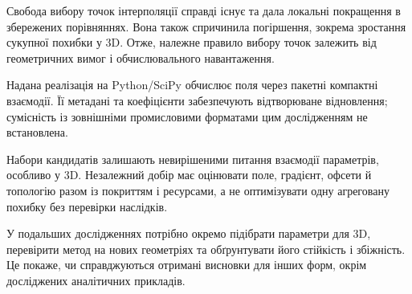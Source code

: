 \documentclass[12pt]{article}
\begin{document}
Свобода вибору точок інтерполяції справді існує та дала локальні покращення в збережених порівняннях. Вона також спричинила погіршення, зокрема зростання сукупної похибки у 3D. Отже, належне правило вибору точок залежить від геометричних вимог і обчислювального навантаження.

Надана реалізація на Python/SciPy обчислює поля через пакетні компактні взаємодії. Її метадані та коефіцієнти забезпечують відтворюване відновлення; сумісність із зовнішніми промисловими форматами цим дослідженням не встановлена.

Набори кандидатів залишають невирішеними питання взаємодії параметрів, особливо у 3D. Незалежний добір має оцінювати поле, градієнт, офсети й топологію разом із покриттям і ресурсами, а не оптимізувати одну агреговану похибку без перевірки наслідків.

У подальших дослідженнях потрібно окремо підібрати параметри для 3D, перевірити метод на нових геометріях та обґрунтувати його стійкість і збіжність. Це покаже, чи справджуються отримані висновки для інших форм, окрім досліджених аналітичних прикладів.

\begin{english}
    \renewcommand{\refname}{\textukrainian{Список літератури}}
    
\end{english}
\end{document}
